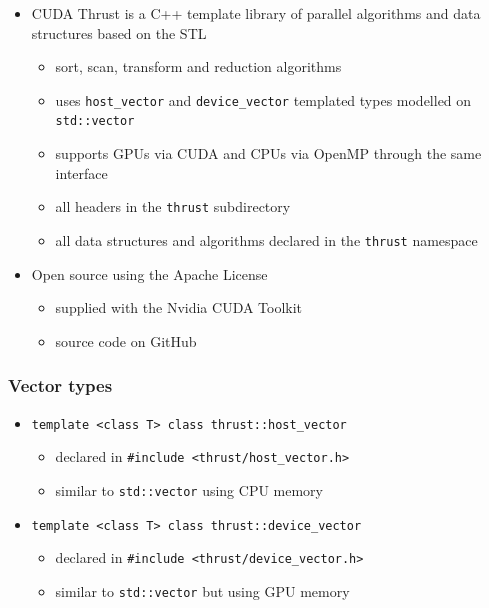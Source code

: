 \begin{itemize}
\itemsep1pt\parskip0pt
\item
  CUDA Thrust is a C++ template library of parallel algorithms and data
  structures based on the STL

  \begin{itemize}
  \itemsep1pt\parskip0pt
  \item
    sort, scan, transform and reduction algorithms
  \item
    uses \texttt{host\_vector} and \texttt{device\_vector} templated
    types modelled on \texttt{std::vector}
  \item
    supports GPUs via CUDA and CPUs via OpenMP through the same
    interface
  \item
    all headers in the \texttt{thrust} subdirectory
  \item
    all data structures and algorithms declared in the \texttt{thrust}
    namespace
  \end{itemize}
\item
  Open source using the Apache License

  \begin{itemize}
  \itemsep1pt\parskip0pt
  \item
    supplied with the Nvidia CUDA Toolkit
  \item
    source code on GitHub
  \end{itemize}
\end{itemize}

\subsubsection{Vector types}\label{vector-types}

\begin{itemize}
\itemsep1pt\parskip0pt
\item
  \texttt{template \textless{}class T\textgreater{} class thrust::host\_vector}

  \begin{itemize}
  \itemsep1pt\parskip0pt
  \item
    declared in
    \texttt{\#include \textless{}thrust/host\_vector.h\textgreater{}}
  \item
    similar to \texttt{std::vector} using CPU memory
  \end{itemize}
\item
  \texttt{template \textless{}class T\textgreater{} class thrust::device\_vector}

  \begin{itemize}
  \itemsep1pt\parskip0pt
  \item
    declared in
    \texttt{\#include \textless{}thrust/device\_vector.h\textgreater{}}
  \item
    similar to \texttt{std::vector} but using GPU memory
  \end{itemize}
\end{itemize}


